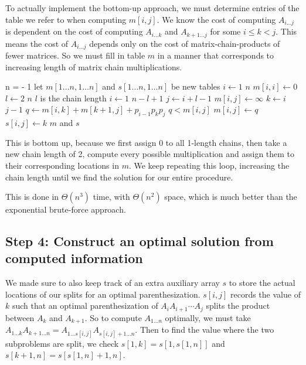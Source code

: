 \documentclass[11pt]{article}
\theoremstyle{definition}
\begin{document}
To actually implement the bottom-up approach, we must determine entries of the table we refer to 
when computing \(m[i,j]\).  We know the cost of computing \(A_{i \dots j}\) is dependent on the 
cost of computing \(A_{i \dots k}\) and \(A_{k+1 \dots j}\) for some \(i \leq k < j\).  This means 
the cost of \(A_{i \dots j}\) depends only on the cost of matrix-chain-products of fewer matrices. 
So we must fill in table \(m\) in a manner that corresponds to increasing length of matrix chain 
multiplications.
\newpage
\begin{codebox}
  \li n =  - 1
  \li let \(m[1 \dots n, 1 \dots n]\) and \(s[1 \dots n, 1 \dots n]\) be new tables
  \li \For \(i \gets 1\) \To \(n\) \Do 
    \li \(m[i,i] \gets 0\) \End
  \li \For \(l \gets 2\) \To \(n\) \Comment \(l\) is the chain length
    \li \Do \For \(i \gets 1\) \To \(n-l+1\)
      \li \Do \(j \gets i+l-1\)
      \li \(m[i,j] \gets \infty\)
      \li \For \(k \gets i\) \To \(j-1\) \Do
        \li \(q \gets m[i,k] + m[k+1,j] + p_{i-1}p_kp_j\)
        \li \If \(q < m[i,j]\)
          \li \Then \(m[i,j] \gets q\)
          \li \(s[i,j] \gets k\) \End \End \End \End
  \li \Return \(m\) and \(s\)
\end{codebox}
This is bottom up, because we first assign 0 to all 1-length chains, then take a new chain length 
of 2, compute every possible multiplication and assign them to their corresponding locations in 
\(m\).  We keep repeating this loop, increasing the chain length until we find the solution for 
our entire procedure.

This is done in \(\Theta(n^3)\) time, with \(\Theta(n^2)\) space, which is much better than the 
exponential brute-force approach.

\subsection*{Step 4: Construct an optimal solution from computed information}
We made sure to also keep track of an extra auxiliary array \(s\) to store the actual locations 
of our splits for an optimal parenthesization.  \(s[i,j]\) records the value of \(k\) such that 
an optimal parenthesization of \(A_i A_{i+1} \cdots A_j\) splits the product between \(A_k\) and 
\(A_{k+1}\).  So to compute \(A_{1 \dots n}\) optimally, we must take 
\(A_{1 \dots k}A_{k+1 \dots n} = A_{1 \dots s[i,j]}A_{s[i,j]+1 \dots n}\).  Then to find the 
value where the two subproblems are split, we check \(s[1,k] = s[1,s[1,n]]\) and 
\(s[k+1,n] = s[s[1,n]+1,n]\). 
\end{document}
